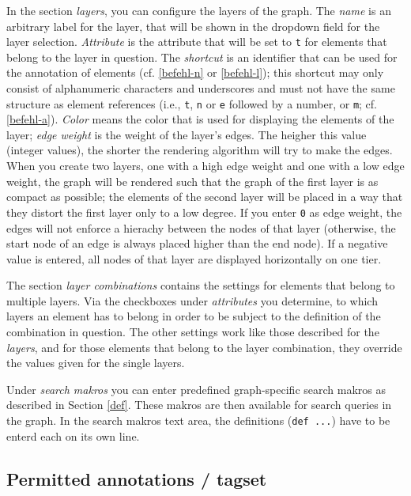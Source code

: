 \documentclass[12pt]{scrartcl}
\begin{document}
In the section \textit{layers}, you can configure the layers of the graph.
The \textit{name} is an arbitrary label for the layer, that will be shown in the dropdown field for the layer selection.
\textit{Attribute} is the attribute that will be set to \texttt{t} for elements that belong to the layer in question.
The \textit{shortcut} is an identifier that can be used for the annotation of elements (cf. \ref{befehl-n} or \ref{befehl-l}); this shortcut may only consist of alphanumeric characters and underscores and must not have the same structure as element references (i.e., \texttt{t}, \texttt{n} or \texttt{e} followed by a number, or  \texttt{m}; cf. \ref{befehl-a}).
\textit{Color} means the color that is used for displaying the elements of the layer; \textit{edge weight} is the weight of the layer’s edges.
The heigher this value (integer values), the shorter the rendering algorithm will try to make the edges.
When you create two layers, one with a high edge weight and one with a low edge weight, the graph will be rendered such that the graph of the first layer is as compact as possible; the elements of the second layer will be placed in a way that they distort the first layer only to a low degree.
If you enter \texttt{0} as edge weight, the edges will not enforce a hierachy between the nodes of that layer (otherwise, the start node of an edge is always placed higher than the end node).
If a negative value is entered, all nodes of that layer are displayed horizontally on one tier.

The section \textit{layer combinations} contains the settings for elements that belong to multiple layers.
Via the checkboxes under \textit{attributes} you determine, to which layers an element has to belong in order to be subject to the definition of the combination in question.
The other settings work like those described for the \textit{layers}, and for those elements that belong to the layer combination, they override the values given for the single layers.

Under \textit{search makros} you can enter predefined graph-specific search makros as described in Section \ref{def}.
These makros are then available for search queries in the graph.
In the search makros text area, the definitions (\texttt{def ...}) have to be enterd each on its own line.

\subsection{Permitted annotations / tagset}\label{erlaubteannotationen}
\end{document}
